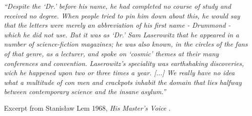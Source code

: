 \clearpage

\normalsize

\vspace*{\fill}


\noindent \textit{``Despite the `Dr.' before his name, he had completed no course of study and received no degree. When people tried to pin him down about this, he would say that the letters were merely an abbreviation of his first name - Drummond - which he did not use. But it was as `Dr.' Sam Laserowitz that he appeared in a number of science-fiction magazines; he was also known, in the circles of the fans of that genre, as a lecturer, and spoke on `cosmic' themes at their many conferences and convention. Laserowitz's speciality was earthshaking discoveries, wich he happened upon two or three times a year. [...] We really have no idea what a multitude of con men and crackpots inhabit the domain that lies halfway between contemporary science and the insane asylum.''}
\vspace{\baselineskip}

\noindent Excerpt from Stanis\l aw Lem 1968, \textit{His Master's Voice} \citep[p.~38]{Lem1984}.

% 
% 

\vfill

